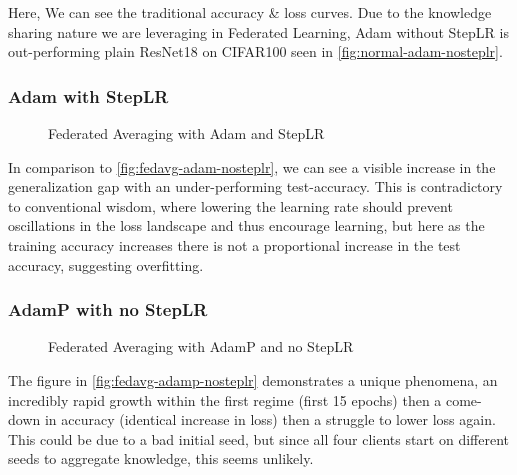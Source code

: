 Here, We can see the traditional accuracy \& loss curves. Due to the knowledge sharing nature we are leveraging in Federated Learning, Adam without StepLR is out-performing plain ResNet18 on CIFAR100 seen in \autoref{fig:normal-adam-nosteplr}.
 
\newpage
\subsubsection{Adam with StepLR}

\begin{figure}[H]
    \centering
    \hspace{-0.80cm}
    \caption{Federated Averaging with Adam and StepLR}
    \label{fig:fedavg-adam-steplr}
\end{figure}

In comparison to \autoref{fig:fedavg-adam-nosteplr}, we can see a visible increase in the generalization gap with an under-performing test-accuracy. This is contradictory to conventional wisdom, where lowering the learning rate should prevent oscillations in the loss landscape and thus encourage learning, but here as the training accuracy increases there is not a proportional increase in the test accuracy, suggesting overfitting. 

\newpage
\subsubsection{AdamP with no StepLR}

\begin{figure}[H]
    \centering
    \hspace{-0.80cm}
    \caption{Federated Averaging with AdamP and no StepLR}
    \label{fig:fedavg-adamp-nosteplr}
\end{figure}

The figure in \autoref{fig:fedavg-adamp-nosteplr} demonstrates a unique phenomena, an incredibly rapid growth within the first regime (first 15 epochs) then a come-down in accuracy (identical increase in loss) then a struggle to lower loss again. This could be due to a bad initial seed, but since all four clients start on different seeds to aggregate knowledge, this seems unlikely.\\

